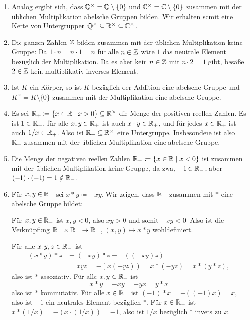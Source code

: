 \begin{enumerate}[leftmargin=*]
 \item
  Analog ergibt sich, dass $\mathbb{Q}^\times = \mathbb{Q} \setminus \{0\}$ und $\mathbb{C}^\times = \mathbb{C} \setminus \{0\}$ zusammen mit der üblichen Multiplikation abelsche Gruppen bilden. Wir erhalten somit eine Kette von Untergruppen $\mathbb{Q}^\times \subseteq \mathbb{R}^\times \subseteq \mathbb{C}^\times$.
 \item
  Die ganzen Zahlen $\mathbb{Z}$ bilden zusammen mit der üblichen Multiplikation keine Gruppe: Da $1 \cdot n = n \cdot 1 = n$ für alle $n \in \mathbb{Z}$ wäre $1$ das neutrale Element bezüglich der Multiplikation. Da es aber kein $n \in \mathbb{Z}$ mit $n \cdot 2 = 1$ gibt, besäße $2 \in \mathbb{Z}$ kein multiplikativ inverses Element.
 \item
  Ist $K$ ein Körper, so ist $K$ bezüglich der Addition eine abelsche Gruppe und $K^\times = K \setminus \{0\}$ zusammen mit der Multiplikation eine abelsche Gruppe.
 \item
  Es sei $\mathbb{R}_+ \coloneqq \{x \in \mathbb{R} \mid x > 0\} \subseteq \mathbb{R}^\times$ die Menge der positiven reellen Zahlen. Es ist $1 \in \mathbb{R}_+$, für alle $x,y \in \mathbb{R}_+$ ist auch $x \cdot y \in \mathbb{R}_+$, und für jedes $x \in \mathbb{R}_+$ ist auch $1/x \in \mathbb{R}_+$. Also ist $\mathbb{R}_+ \subseteq \mathbb{R}^\times$ eine Untergruppe. Insbesondere ist also $\mathbb{R}_+$ zusammen mit der üblichen Multiplikation eine abelsche Gruppe.
 \item
  Die Menge der negativen reellen Zahlen $\mathbb{R}_- \coloneqq \{x \in \mathbb{R} \mid x < 0\}$ ist zusammen mit der üblichen Multiplikation keine Gruppe, da zwa, $-1 \in \mathbb{R}_-$, aber $(-1) \cdot (-1) = 1 \notin \mathbb{R}_-$.
 \item
  Für $x,y \in \mathbb{R}_-$ sei $x * y \coloneqq -xy$. Wir zeigen, dass $\mathbb{R}_-$ zusammen mit $*$ eine abelsche Gruppe bildet:
  
  Für $x,y \in \mathbb{R}_-$ ist $x,y < 0$, also $xy > 0$ und somit $-xy < 0$. Also ist die Verknüpfung $\mathbb{R}_- \times \mathbb{R}_- \to \mathbb{R}_-$, $(x,y) \mapsto x*y$ wohldefiniert.
  
  Für alle $x,y,z \in \mathbb{R}_-$ ist
  \begin{align*}
   (x * y) * z
   &= (-xy) * z
   = -((-xy)z) \\
   &= xyz
   = -(x(-yz))
   = x * (-yz)
   = x * (y * z),
  \end{align*}
  also ist $*$ assoziativ. Für alle $x,y \in \mathbb{R}_-$ ist
  \[
   x * y = -xy = -yx = y * x
  \]
  also ist $*$ kommutativ. Für alle $x \in \mathbb{R}_-$ ist $(-1) * x = -((-1)x) = x$, also ist $-1$ ein neutrales Element bezüglich $*$. Für $x \in \mathbb{R}_-$ ist $x * (1/x) = -(x \cdot (1/x)) = -1$, also ist $1/x$ bezüglich $*$ invers zu $x$.
  

\end{enumerate}
